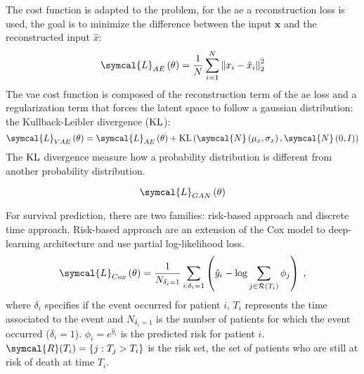 \documentclass[../main.tex]{subfiles}
\begin{document}
	 The cost function is adapted to the problem, for the \gls{ae} a reconstruction loss is used, the goal is to minimize the difference between the input \(\symbf{x}\) and the reconstructed input \(\hat{x}\):
	 \begin{equation}
		 \symcal{L}_{AE}\left(\theta\right) = \frac{1}{N}\sum_{i=1}^{N} {\left\|x_i - \hat{x}_i \right\|}_2^{2}
	 \end{equation}
	 The \gls{vae} cost function is composed of the reconstruction term of the \gls{ae} loss and a regularization term that forces the latent space to follow a gaussian distribution: the Kullback-Leibler divergence (\(\operatorname{KL}\)):
	 \begin{equation}
		 \symcal{L}_{VAE}\left(\theta\right) = \symcal{L}_{AE}\left(\theta\right) + \KL\left(\symcal{N}\left(\mu_{x}, \sigma_{x}\right), \symcal{N}\left(0, I\right)\right)
	 \end{equation}
	 The \(\operatorname{KL}\) divergence measure how a probability distribution is different from another probability distribution.

	 \begin{equation}
		 \symcal{L}_{GAN}\left(\theta\right)
	 \end{equation}

	 For survival prediction, there are two families: risk-based approach and discrete time approach.
	 Risk-based approach are an extension of the Cox model to deep-learning architecture and use partial log-likelihood loss.
	 \begin{equation}
		 \symcal{L}_{Cox}\left(\theta\right) = \frac{1}{N_{\delta_i = 1}} \sum_{i:\delta_i=1} \left(\hat{y}_i - \log \sum_{j \in \mathcal{R}(T_i)}\phi_j \right)\; \text{,}
	 \end{equation}
	 where \(\delta_i\) specifies if the event occurred for patient \(i\), \(T_i\) represents the time associated to the event and \(N_{\delta_i = 1}\) is the number of patients for which the event occurred (\(\delta_i = 1\)).
	 \(\phi_i = e^{\hat{y}_i}\) is the predicted risk for patient \(i\).
	 \(\symcal{R}(T_i) = \{j: T_j > T_i\}\) is the risk set, the set of patients who are still at risk of death at time \(T_i\).
\end{document}
